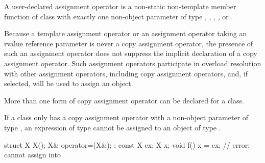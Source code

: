 \pnum
{}%
%
%
%
%
%
%
A user-declared  assignment operator  is a
non-static non-template member function of class  with exactly one
non-object parameter of type , , ,
, or .
\begin{footnote}
Because
a template assignment operator or an assignment operator
taking an rvalue reference parameter is never a copy assignment operator,
the presence of such an assignment operator does not suppress the
implicit declaration of a copy assignment operator. Such assignment operators
participate in overload resolution with other assignment operators, including
copy assignment operators, and, if selected, will be used to assign an object.
\end{footnote}
\begin{note}
More than one form of copy assignment operator can be declared for a class.
\end{note}
\begin{note}
If a class
only has a copy assignment operator with a non-object parameter of type
,
an expression of type
cannot be assigned to an object of type
.
\begin{example}
\begin{codeblock}
struct X {
  X();
  X& operator=(X&);
};
const X cx;
X x;
void f() {
  x = cx;           // error:  cannot assign  into 
}
\end{codeblock}
\end{example}
\end{note}

